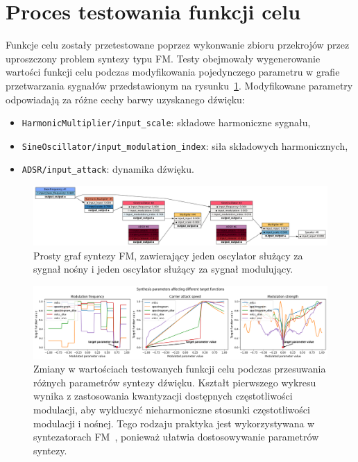 \section{Proces testowania funkcji celu}

Funkcje celu zostały przetestowane poprzez wykonwanie
zbioru przekrojów przez uproszczony problem syntezy typu FM\@.
Testy obejmowały wygenerowanie wartości funkcji celu podczas
modyfikowania pojedynczego parametru w grafie przetwarzania sygnałów
przedstawionym na rysunku~\ref{fig:fm_graph_for_benchmarks}.
Modyfikowane parametry odpowiadają za różne cechy barwy uzyskanego dźwięku:

\begin{itemize}
  \item \texttt{HarmonicMultiplier/input\_scale}:  składowe harmoniczne sygnału,
  \item \texttt{SineOscillator/input\_modulation\_index}: siła składowych harmonicznych,
  \item \texttt{ADSR/input\_attack}: dynamika dźwięku.
\end{itemize}

\begin{figure}[H]\label{fig:fm_graph_for_benchmarks}
    \centering
    \includegraphics[width=1.0\linewidth]{rys03/fm_graph_for_benchmarks.png}
    \caption{
      Prosty graf syntezy FM, zawierający jeden oscylator służący za sygnał nośny
      i jeden oscylator służący za sygnał modulujący.
    }
\end{figure}

\begin{figure}[H]\label{fig:target_function_testing}
    \centering
    \includegraphics[width=1.0\linewidth]{rys03/target_function_testing.png}
    \caption{
      Zmiany w wartościach testowanych funkcji celu podczas przesuwania różnych parametrów syntezy dźwięku. 
      Kształt pierwszego wykresu wynika z zastosowania kwantyzacji dostępnych częstotliwości modulacji,
      aby wykluczyć nieharmoniczne stosunki częstotliwości modulacji i nośnej. Tego rodzaju praktyka
      jest wykorzystywana w syntezatorach FM~\cite{digitone_manual}, ponieważ ułatwia dostosowywanie parametrów syntezy.
    }
\end{figure}

